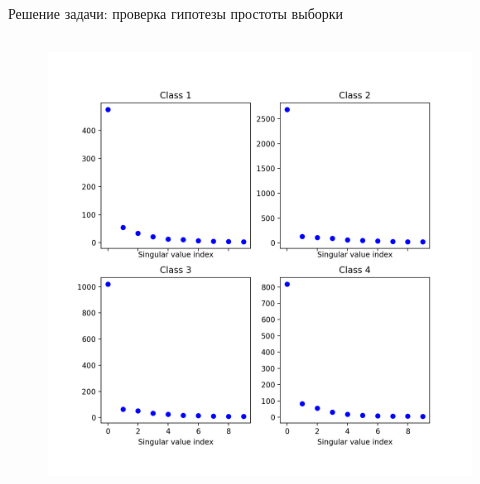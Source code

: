\documentclass{beamer}
\begin{document}
\begin{frame}{Решение задачи: проверка гипотезы простоты выборки}
\begin{columns}[T]
\begin{column}{.48\textwidth}
    \begin{figure}[ht]
        \centering
          \includegraphics[width=\textwidth]{../pics/sv_analysis.png}
    \end{figure}

        \end{column}%
    \end{columns}
\end{frame}

\end{document}
